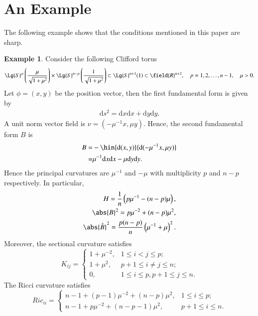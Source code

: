 \documentclass[12pt]{amsart}
\theoremstyle{plain}
\theoremstyle{remark}
\theoremstyle{definition}
\newtheorem{eg}{Example}[section]
\numberwithin{equation}{section}
\begin{document}
\section{An Example}
The following example shows that the conditions mentioned in this paper are sharp.
\begin{eg}Consider the following Clifford torus
\begin{align*}\Lg{S}^p\left(\dfrac{\mu}{\sqrt{1+\mu^2}}\right)\times\Lg{S}^{n-p}\left(\dfrac{1}{\sqrt{1+\mu^2}}\right)\subset\Lg{S}^{n+1}(1)\subset{\field{R}}^{n+2},\quad p=1,2,\dotsc, n-1,\quad \mu>0.
\end{align*}
Let $\phi=(x,y)$ be the position vector, then the first fundamental form is given by
\begin{align*}
{\mathrm d} s^2={\mathrm d} x{\mathrm d} x+{\mathrm d} y{\mathrm d} y.
\end{align*}
A unit norm vector field is $\nu=(-\mu^{-1}x,\mu y)$. Hence, the second fundamental form $B$ is
\begin{align*}
B=&-\hin{{\mathrm d}(x,y)}{{\mathrm d}(-\mu^{-1}x,\mu y)}\\
=&\mu^{-1}{\mathrm d} x{\mathrm d} x-\mu{\mathrm d} y{\mathrm d} y.
\end{align*}
Hence the principal curvatures are $\mu^{-1}$ and $-\mu$ with multiplicity $p$ and $n-p$ respectively. In particular,
\begin{align*}
H=\dfrac{1}{n}\left(p\mu^{-1}-(n-p)\mu\right),\\
\abs{B}^2=p\mu^{-2}+(n-p)\mu^2,\\
\abs{\mathring{B}}^2=\dfrac{p(n-p)}{n}\left(\mu^{-1}+\mu\right)^2.
\end{align*}
Moreover, the sectional curvature satisfies
\begin{equation*}
K_{ij}=
\begin{cases}
1+\mu^{-2},& 1\leq i< j\leq p;\\
1+\mu^{2},&p+1\leq i\neq j\leq n;\\
0,&1\leq i\leq p, p+1\leq j\leq n.
\end{cases}
\end{equation*}
The Ricci curvature satisfies
\begin{equation*}
Ric_{ii}=
\begin{cases}
n-1+(p-1)\mu^{-2}+(n-p)\mu^2,&1\leq i\leq p;\\
n-1+p\mu^{-2}+(n-p-1)\mu^2,&p+1\leq i\leq n.
\end{cases}
\end{equation*}


\end{eg}
\end{document}
